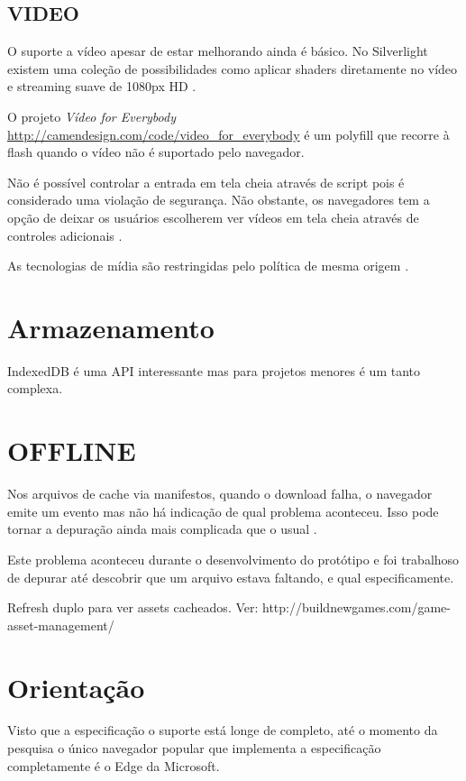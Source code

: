 \subsection{VIDEO}

O suporte a vídeo apesar de estar melhorando ainda é básico. No
Silverlight existem uma coleção de possibilidades como aplicar shaders
diretamente no vídeo e streaming suave de 1080px HD \autocite[pp.
8]{researchOnHtml}.

O projeto \textit{Vídeo for Everybody}
\url{http://camendesign.com/code/video_for_everybody} é um polyfill que
recorre à flash quando o vídeo não é suportado pelo navegador.

Não é possível controlar a entrada em tela cheia através de script
pois é considerado uma violação de segurança. Não obstante,
os navegadores tem a opção de deixar os usuários escolherem ver
vídeos em tela cheia através de controles adicionais \autocite[pp.
68]{proHtml5}.

As tecnologias de mídia são restringidas pelo política de mesma
origem \autocite[pp. 68]{proHtml5}.

\section{Armazenamento}

IndexedDB é uma API interessante mas para projetos menores é um tanto complexa.

\section{OFFLINE}

Nos arquivos de cache via manifestos, quando o download falha, o
navegador emite um evento mas não há indicação de qual problema
aconteceu. Isso pode tornar a depuração ainda mais complicada que o
usual \autocite{diveIntohtml}.

Este problema aconteceu durante o desenvolvimento do protótipo e foi
trabalhoso de depurar até descobrir que um arquivo estava faltando, e
qual especificamente.

Refresh duplo para ver assets cacheados. Ver:
http://buildnewgames.com/game-asset-management/

\section{Orientação}

Visto que a especificação o suporte está longe de completo, até
o momento da pesquisa o único navegador popular que implementa a
especificação completamente é o Edge da Microsoft.

